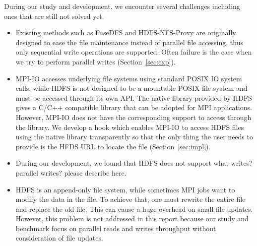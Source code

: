 During our study and development, we encounter several
challenges including ones that are still not solved yet.
\begin{itemize}
\item Existing methods such as FuseDFS and HDFS-NFS-Proxy are originally designed to ease the file
	maintenance instead of parallel file accessing, thus only sequential
	write operations are supported. Often failure is the case when we try to
	perform parallel writes (Section~\ref{sec:exp}). 
\item MPI-IO accesses underlying file systems using standard POSIX IO system
	calls, while HDFS is not designed to be a mountable POSIX file system
	and must be accessed through its own API. The native library provided by
	HDFS gives a C/C++ compatible library that can be adopted for MPI
	applications.
	However, MPI-IO does not have the corresponding support to access
	through the library. We develop a hook which enables MPI-IO to access
	HDFS files using the native library transparently so that the only thing
	the user needs to provide is the HFDS URL to locate the file
	(Section~\ref{sec:impl}).
\item During our development, we found that HDFS does not support 
{\color{red} what writes? parallel writes? please describe here. }
\item HDFS is an append-only file system, while sometimes MPI jobs want to
	modify the data in the file. To achieve that, one must rewrite the
	entire file and replace the old file. This can cause a huge overhead on
	small file updates. However, this problem is not addressed in this
	report because our study and benchmark focus on parallel reads and
	writes throughput without consideration of file updates.
\end{itemize}


